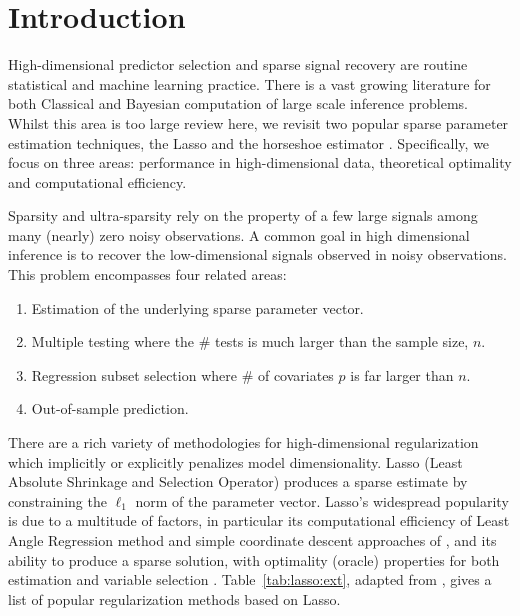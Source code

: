 \documentclass[sts,preprint]{imsart}
\begin{document}
\section{Introduction}

High-dimensional predictor selection and sparse signal recovery are routine statistical and machine learning practice. There is a vast growing literature for both Classical and Bayesian computation of large scale inference problems. Whilst this area is too large review here, we revisit two popular sparse parameter estimation techniques, the Lasso \citep{tibshirani96} and the horseshoe estimator \citep{carvalho2010horseshoe}. Specifically, we focus on three areas: performance in high-dimensional data, theoretical optimality and computational efficiency. 

Sparsity and ultra-sparsity rely on the property of a few large signals among many (nearly) zero noisy observations. A common goal in high dimensional inference is to recover the low-dimensional signals observed in noisy observations. This problem encompasses four related areas: 
\begin{enumerate}
  \item Estimation of the underlying sparse parameter vector. 
  \item Multiple testing where the \# tests is much larger than the sample size, $n$. 
  \item Regression subset selection where \# of covariates $p$ is far larger than $n$. 
	\item Out-of-sample prediction. 
\end{enumerate}

There are a rich variety of methodologies for high-dimensional regularization which implicitly or explicitly penalizes model dimensionality. Lasso (Least Absolute Shrinkage and Selection Operator) produces a sparse estimate by constraining the $\ell_1$ norm of the parameter vector. Lasso's widespread popularity is due to a multitude of factors, in particular its computational efficiency of Least Angle Regression method \citep{efron_least_2004} and simple coordinate descent approaches of \citet{friedman_pathwise_2007}, and its ability to produce a sparse solution, with optimality (oracle) properties for both estimation and variable selection \citep[\textit{vide}][]{buhlmann2011statistics, james2013introduction, hastie2015statistical}. Table~\ref{tab:lasso:ext}, adapted from \citet{tibshirani2014praise},  gives a list of popular regularization methods based on Lasso. \par 
\end{document}
